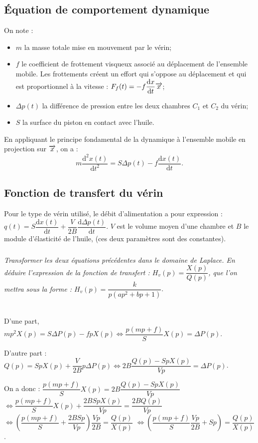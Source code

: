 \documentclass[10pt,fleqn]{article} %
\begin{document}
\begin{multicols}{2}
\subsection*{Équation de comportement dynamique}
\ifprof
\else
On note : 
\begin{itemize}
\item $m$ la masse totale mise en mouvement par le vérin;
\item $f$ le coefficient de frottement visqueux associé au déplacement de l'ensemble mobile. Les frottements créent un effort qui s'oppose au déplacement et qui est proportionnel à la vitesse : $F_f(t)=-f\dfrac{\text{d} x}{\text{d} t} \overrightarrow{x}$;
\item $\Delta p(t)$ la différence de pression entre les deux chambres $C_1$ et $C_2$ du vérin;
\item $S$ la surface du piston en contact avec l'huile.
\end{itemize}
En appliquant le principe fondamental de la dynamique à l'ensemble mobile en projection sur $\overrightarrow{x}$, on a : 
$$m\dfrac{\text{d}^2 x(t) }{\text{d}t^2}=S\Delta p(t)-f\dfrac{\text{d} x(t) }{\text{d}t}.$$
\fi


\subsection*{Fonction de transfert du vérin}
\ifprof
\else
Pour le type de vérin utilisé, le débit d'alimentation a pour expression : $q(t)=S\dfrac{\text{d}x(t)}{\text{d} t}+\dfrac{V}{2B}\dfrac{\text{d}\Delta p(t)}{\text{d}t}$. $V$ est le volume moyen d'une chambre et $B$ le module d'élasticité de l'huile, (ces deux paramètres sont des constantes).
\fi

\subparagraph{}\textit{Transformer les deux équations précédentes dans le domaine de Laplace. En déduire l'expression de la fonction de transfert : $H_v(p)=\dfrac{X(p)}{Q(p)}$, que l'on mettra sous la forme : $H_v(p)=\dfrac{k}{p\left( ap^2 + bp + 1\right)}$}.
\ifprof \begin{corrige} ~\\
D'une part, $mp^2X(p)=S\Delta P(p)-fpX(p) \Leftrightarrow \dfrac{p\left(mp+f\right)}{S}X(p)=\Delta P(p) $.

D'autre part :
$Q(p)=SpX(p)+\dfrac{V}{2B}p\Delta P(p) \Leftrightarrow 2B\dfrac{Q(p)-SpX(p)}{Vp}=\Delta P(p) $.

On a donc : 
$\dfrac{p\left(mp+f\right)}{S}X(p) =
2B\dfrac{Q(p)-SpX(p)}{Vp}$
$\Longleftrightarrow
\dfrac{p\left(mp+f\right)}{S}X(p) +\dfrac{2BSpX(p)}{Vp}=
\dfrac{2BQ(p)}{Vp}$
$\Longleftrightarrow
\left(\dfrac{p\left(mp+f\right)}{S} +\dfrac{2BSp}{Vp}\right) \dfrac{Vp}{2B}=
\dfrac{Q(p)}{ X(p)}$
$\Longleftrightarrow
\left(\dfrac{p\left(mp+f\right)}{S} \dfrac{Vp}{2B}+Sp \right) =
\dfrac{Q(p)}{ X(p)}$.


\end{corrige}
\end{multicols}
\end{document}
